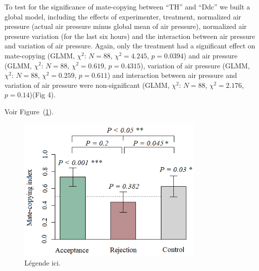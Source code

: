 \documentclass[a4paper, 12pt]{article}
\begin{document}
	To test for the significance of mate-copying between ``TH'' and ``Ddc'' we built a global model, including the effects of experimenter, treatment, normalized air pressure (actual air pressure minus global mean of air pressure), normalized air pressure variation (for the last six hours) and the interaction between air pressure and variation of air pressure. Again, only the treatment had a significant effect on mate-copying (GLMM, $\chi^2$: $N = 88$, $\chi^2 = 4.245$, $p = 0.0394$) and air pressure (GLMM, $\chi^2$: $N = 88$, $\chi^2 = 0.619$, $p = 0.4315$), variation of air pressure (GLMM, $\chi^2$: $N = 88$, $\chi^2 = 0.259$, $p = 0.611$) and interaction between air pressure and variation of air pressure were non-significant (GLMM, $\chi^2$: $N = 88$, $\chi^2 = 2.176$, $p = 0.14$)(Fig 4).
	
	
	 
	Voir Figure~(\ref{fig:mcsar}).
 


	\begin{figure}
	\centering
	\includegraphics[width=0.8\textwidth]{images/mcsar}
	\caption{Légende ici.}
	\label{fig:mcsar}
\end{figure}


\clearpage
\newrefcontext[sorting=nyt] %
\printbibliography
 
\end{document}
